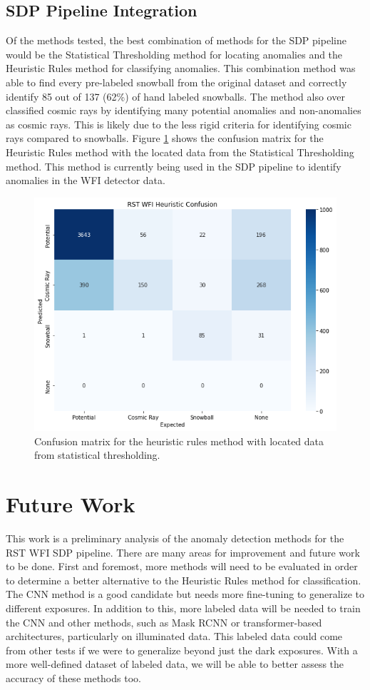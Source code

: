 \subsection{SDP Pipeline Integration}
Of the methods tested, the best combination of methods for the SDP pipeline would be the Statistical Thresholding method for locating anomalies and the Heuristic Rules method for classifying anomalies.
This combination method was able to find every pre-labeled snowball from the original dataset and correctly identify 85 out of 137 (62\%) of hand labeled snowballs. 
The method also over classified cosmic rays by identifying many potential anomalies and non-anomalies as cosmic rays.
This is likely due to the less rigid criteria for identifying cosmic rays compared to snowballs.
Figure \ref{rst/fig:heuristic_confusion} shows the confusion matrix for the Heuristic Rules method with the located data from the Statistical Thresholding method.
This method is currently being used in the SDP pipeline to identify anomalies in the WFI detector data.

\begin{figure}
    \centering
    \includegraphics[width=.7\textwidth]{figs/rst/heuristic_confusion.png}
    \caption[Confusion Matrix for Heuristic rules with Statistical Thresholding]{Confusion matrix for the heuristic rules method with located data from statistical thresholding.}
    \label{rst/fig:heuristic_confusion}
\end{figure}

\section{Future Work}
\label{rst/sec:future}
This work is a preliminary analysis of the anomaly detection methods for the RST WFI SDP pipeline.
There are many areas for improvement and future work to be done.
First and foremost, more methods will need to be evaluated in order to determine a better alternative to the Heuristic Rules method for classification. 
The CNN method is a good candidate but needs more fine-tuning to generalize to different exposures.
In addition to this, more labeled data will be needed to train the CNN and other methods, such as Mask RCNN or transformer-based architectures, particularly on illuminated data.
This labeled data could come from other tests if we were to generalize beyond just the dark exposures.
With a more well-defined dataset of labeled data, we will be able to better assess the accuracy of these methods too. 

